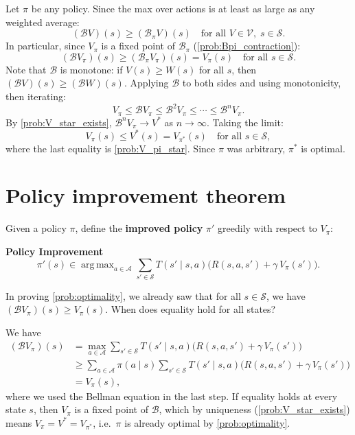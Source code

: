 \documentclass[11pt]{article}
\newcommand{\cS}{\mathcal{S}}
\newcommand{\cA}{\mathcal{A}}
\DeclareMathOperator*{\argmax}{arg\,max}
\begin{document}
\begin{solution}
Let $\pi$ be any policy. Since the max over actions is at least as large as any weighted average:
$$
(\mathcal{B} V)(s) \ge (\mathcal{B}_\pi V)(s) \quad \text{for all } V \in \mathcal{V},\; s \in \cS.
$$
In particular, since $V_\pi$ is a fixed point of $\mathcal{B}_\pi$ (\cref{prob:Bpi_contraction}):
$$
(\mathcal{B} V_\pi)(s) \ge (\mathcal{B}_\pi V_\pi)(s) = V_\pi(s) \quad \text{for all } s \in \cS.
$$
Note that $\mathcal{B}$ is monotone: if $V(s) \ge W(s)$ for all $s$, then $(\mathcal{B} V)(s) \ge (\mathcal{B} W)(s)$. Applying $\mathcal{B}$ to both sides and using monotonicity, then iterating:
$$
V_\pi \le \mathcal{B} V_\pi \le \mathcal{B}^2 V_\pi \le \cdots \le \mathcal{B}^n V_\pi.
$$
By \cref{prob:V_star_exists}, $\mathcal{B}^n V_\pi \to V^*$ as $n \to \infty$. Taking the limit:
$$
V_\pi(s) \le V^*(s) = V_{\pi^*}(s) \quad \text{for all } s \in \cS,
$$
where the last equality is \cref{prob:V_pi_star}. Since $\pi$ was arbitrary, $\pi^*$ is optimal.
\end{solution}



\section{Policy improvement theorem}\label{prob:policy_improvement}

Given a policy $\pi$, define the \textbf{improved policy} $\pi'$ greedily with respect to $V_\pi$:

\begin{callout}[note]
\textbf{Policy Improvement}
$$
\pi'(s) \in \argmax_{a \in \cA} \sum_{s' \in \cS} T(s' \mid s, a)\bigl(R(s,a,s') + \gamma\, V_\pi(s')\bigr).
$$
\end{callout}

\begin{exercise}
\label{prob:when_equality} In proving \cref{prob:optimality}, we already saw that for all $s \in \cS$, we have
$(\mathcal{B} V_\pi)(s) \ge V_\pi(s)$.
When does equality hold for all states?
\end{exercise}

\begin{solution}
We have
\begin{align*}
(\mathcal{B} V_\pi)(s) &= \max_{a \in \cA} \sum_{s' \in \cS} T(s' \mid s, a)\bigl(R(s,a,s') + \gamma\, V_\pi(s')\bigr) \\
&\ge \sum_{a \in \cA} \pi(a \mid s) \sum_{s' \in \cS} T(s' \mid s, a)\bigl(R(s,a,s') + \gamma\, V_\pi(s')\bigr) \\
&= V_\pi(s),
\end{align*}
where we used the Bellman equation in the last step.
If equality holds at every state $s$, then $V_\pi$ is a fixed point of $\mathcal{B}$, which by uniqueness (\cref{prob:V_star_exists}) means $V_\pi = V^* = V_{\pi^*}$, i.e.\ $\pi$ is already optimal by \cref{prob:optimality}.
\end{solution}
\end{document}
